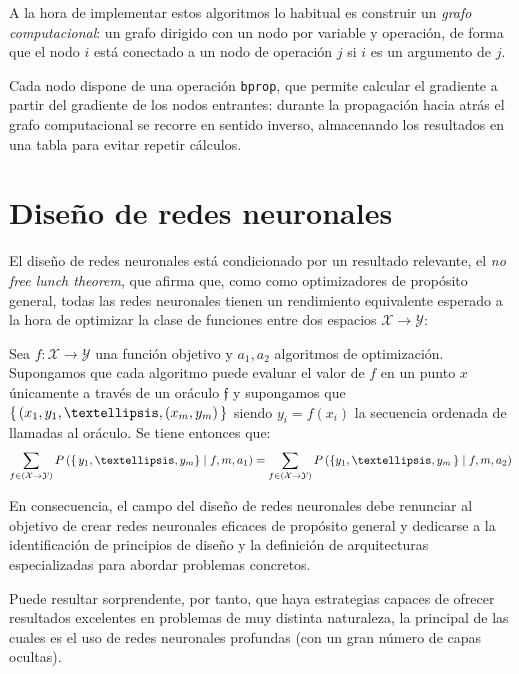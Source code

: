 A la hora de implementar estos algoritmos lo habitual es construir un \textit{grafo computacional}: un grafo dirigido con un nodo por variable y operación, de forma que el nodo \( i \) está conectado a un nodo de operación \( j \) si \( i \) es un argumento de \( j \). 

Cada nodo dispone de una operación \texttt{bprop}, que permite calcular el gradiente a partir del gradiente de los nodos entrantes: durante la propagación hacia atrás el grafo computacional se recorre en sentido inverso, almacenando los resultados en una tabla para evitar repetir cálculos.

\section{Diseño de redes neuronales}
El diseño de redes neuronales está condicionado por un resultado relevante, el \textit{no free lunch theorem}, que afirma que, como como optimizadores de propósito general, todas las redes neuronales tienen un rendimiento equivalente esperado a la hora de optimizar la clase de funciones entre dos espacios \( \mathcal{X} \to \mathcal{Y} \):
\begin{definition}
    Sea \( f \colon \mathcal{X} \to \mathcal{Y} \) una función objetivo y \( a_1, a_2 \) algoritmos de optimización. Supongamos que cada algoritmo puede evaluar el valor de \( f \) en un punto \( x \) únicamente a través de un oráculo \( \mathfrak{f} \) y supongamos que \( \Set{ (x_{1}, y_{1}, …, (x_{m}, y_{m}) } \) siendo \( y_{i} = f(x_{i}) \) la secuencia ordenada de llamadas al oráculo. Se tiene entonces que:
    \[
        \sum_{f \in (\mathcal{X} \to \mathcal{Y})} P \left( \Set{ y_{1}, …, y_{m} \} \mid f, m, a_1 \right) = \sum_{f \in (\mathcal{X} \to \mathcal{Y})} P \left( \{ y_{1}, …, y_{m}} \mid f, m, a_2 \right)
    \]
\end{definition}

En consecuencia, el campo del diseño de redes neuronales debe renunciar al objetivo de crear redes neuronales eficaces de propósito general y dedicarse a la identificación de principios de diseño y la definición de arquitecturas especializadas para abordar problemas concretos. 

Puede resultar sorprendente, por tanto, que haya estrategias capaces de ofrecer resultados excelentes en problemas de muy distinta naturaleza, la principal de las cuales es el uso de redes neuronales profundas (con un gran número de capas ocultas).

